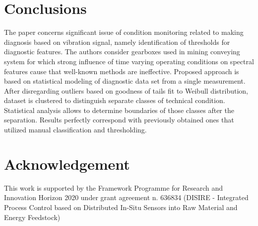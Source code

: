 \documentclass[10pt]{article}
\begin{document}
\section{Conclusions}
The paper concerns significant issue of condition monitoring related to making diagnosis based on vibration signal, namely identification of thresholds for diagnostic features. The authors consider gearboxes used in mining conveying system for which strong influence of time varying operating conditions on spectral features cause that well-known methods are ineffective. Proposed approach is based on statistical modeling of diagnostic data set from a single measurement. After disregarding outliers based on goodness of tails fit to Weibull distribution, dataset is clustered to distinguish separate classes of technical condition. Statistical analysis allows to determine boundaries of those classes after the separation. Results perfectly correspond with previously obtained ones that utilized manual classification and thresholding.

\section*{Acknowledgement}
This work is supported by the Framework Programme for Research and Innovation Horizon 2020 under grant agreement n. 636834 (DISIRE - Integrated Process Control based on Distributed In-Situ Sensors into Raw Material and Energy Feedstock) 



\small
\end{document}
